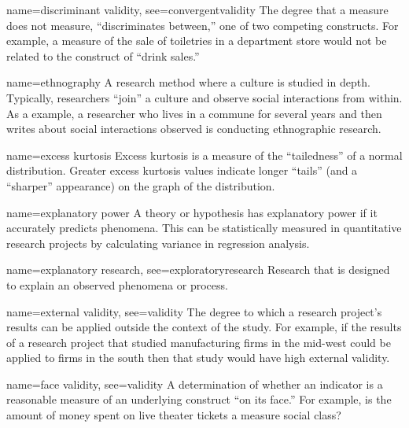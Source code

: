 {name={discriminant validity},
	see={convergentvalidity}}
{%
	The degree that a measure does not measure, ``discriminates between,'' one of two competing constructs. For example, a measure of the sale of toiletries in a department store would not be related to the construct of ``drink sales.'' 
}


{name={ethnography}}
{%
	A research method where a culture is studied in depth. Typically, researchers ``join'' a culture and observe social interactions from within. As a example, a researcher who lives in a commune for several years and then writes about social interactions observed is conducting ethnographic research.
}

{name={excess kurtosis}}
{%
	Excess kurtosis is a measure of the ``tailedness'' of a normal distribution. Greater excess kurtosis values indicate longer ``tails'' (and a ``sharper'' appearance) on the graph of the distribution.
}

{name={explanatory power}}
{%
	A theory or hypothesis has explanatory power if it accurately predicts phenomena. This can be statistically measured in quantitative research projects by calculating variance in regression analysis.
}

{name={explanatory research},
	see={exploratoryresearch}}
{%
	Research that is designed to explain an observed phenomena or process. 
}


{name={external validity},
	see={validity}}
{%
	The degree to which a research project's results can be applied outside the context of the study. For example, if the results of a research project that studied manufacturing firms in the mid-west could be applied to firms in the south then that study would have high external validity.
}

{name={face validity},
	see={validity}}
{%
	A determination of whether an indicator is a reasonable measure of an underlying construct ``on its face.'' For example, is the amount of money spent on live theater tickets a measure social class?
}

